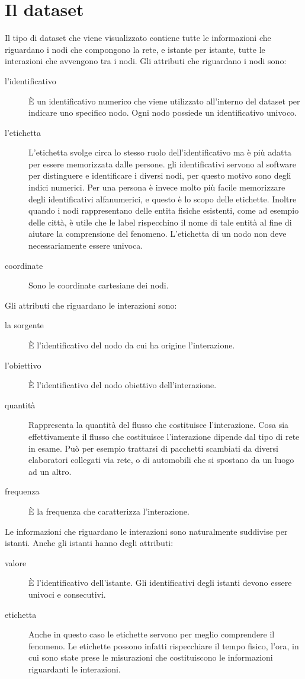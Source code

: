 \documentclass[a4paper,12pt]{article}
\begin{document}
\section{Il dataset}
Il tipo di dataset che viene visualizzato contiene tutte le informazioni che riguardano i nodi che compongono la rete, e istante per istante, tutte le interazioni che avvengono tra i nodi.
Gli attributi che riguardano i nodi sono:
\begin{description}
 \item[l'identificativo] \`E un identificativo numerico che viene utilizzato all'interno del dataset per indicare uno specifico nodo. Ogni nodo possiede un identificativo univoco.
 \item[l'etichetta] L'etichetta svolge circa lo stesso ruolo dell'identificativo ma \`e più adatta per essere memorizzata dalle persone. gli identificativi servono al software per distinguere e identificare i diversi nodi, per questo motivo sono degli indici numerici. Per una persona \`e invece molto più facile memorizzare degli identificativi alfanumerici, e questo \`e lo scopo delle etichette. Inoltre quando i nodi rappresentano delle entita fisiche esistenti, come ad esempio delle città, \`e utile che le label rispecchino il nome di tale entità al fine di aiutare la comprensione del fenomeno. L'etichetta di un nodo non deve necessariamente essere univoca.
 \item[coordinate] Sono le coordinate cartesiane dei nodi.
\end{description}

Gli attributi che riguardano le interazioni sono:
\begin{description}
 \item[la sorgente] \`E l'identificativo del nodo da cui ha origine l'interazione.
 \item[l'obiettivo] \`E l'identificativo del nodo obiettivo dell'interazione.
 \item[quantità] Rappresenta la quantità del flusso che costituisce l'interazione. Cosa sia effettivamente il flusso che costituisce l'interazione dipende dal tipo di rete in esame. Pu\`o per esempio trattarsi di pacchetti scambiati da diversi elaboratori collegati via rete, o di automobili che si spostano da un luogo ad un altro.
 \item[frequenza] \`E la frequenza che caratterizza l'interazione.
\end{description}

Le informazioni che riguardano le interazioni sono naturalmente suddivise per istanti. Anche gli istanti hanno degli attributi:
\begin{description}
 \item[valore] \`E l'identificativo dell'istante. Gli identificativi degli istanti devono essere univoci e consecutivi.
 \item[etichetta] Anche in questo caso le etichette servono per meglio comprendere il fenomeno. Le etichette possono infatti rispecchiare il tempo fisico, l'ora, in cui sono state prese le misurazioni che costituiscono le informazioni riguardanti le interazioni.
\end{description}
 
\end{document}
